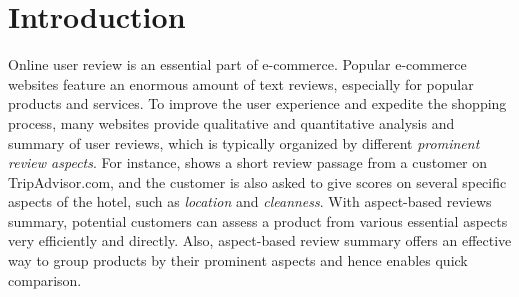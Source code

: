 \section{Introduction}
\label{sec:intro}

Online user review is an essential part of e-commerce. 
Popular e-commerce websites feature an enormous amount of text reviews, 
especially for popular products and services. 
To improve the user experience and expedite the
shopping process, many websites provide qualitative and quantitative
analysis and summary of user reviews, which is typically organized by different 
{\em prominent review aspects}.
For instance,  shows a short review passage from a customer on TripAdvisor.com, and the customer is also asked
to give scores on several specific aspects of 
the hotel, such as \textit{location} and \textit{cleanness}. 
%
With aspect-based reviews summary, potential customers can 
assess a product from various essential aspects very efficiently and directly.
Also, aspect-based review summary offers an effective 
way to group products by their prominent aspects and hence
enables quick comparison.

